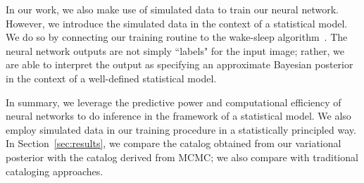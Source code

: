 In our work, we also make use of simulated data to train our neural network. However, we introduce the simulated data in the context of a statistical model. We do so by 
connecting our training routine to the wake-sleep algorithm~\cite{Hinton1995wake_sleep}. 
The neural network outputs are not simply ``labels" for the input image; rather, we are able to interpret the output as specifying an approximate Bayesian posterior in the context of a well-defined statistical model. 

In summary, we leverage the predictive power and computational efficiency of neural networks to do 
inference in the framework of a statistical model. 
We also employ simulated data in our training procedure in a statistically principled way. In Section~\ref{sec:results}, we compare the catalog obtained from our variational posterior with the catalog derived from MCMC; we also compare with traditional cataloging approaches.  






